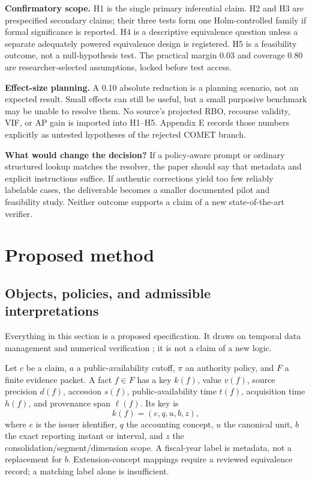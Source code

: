 \documentclass[11pt,a4paper]{article}
\newcommand{\pbreak}{\clearpage}
\newcommand{\lead}[1]{\textbf{\color{navy}#1}}
\newcommand{\status}[1]{\textsf{\color{teal}#1}}
\begin{document}
\lead{Confirmatory scope.} H1 is the single primary inferential claim. H2 and H3 are prespecified secondary claims; their three tests form one Holm-controlled family if formal significance is reported. H4 is a descriptive equivalence question unless a separate adequately powered equivalence design is registered. H5 is a feasibility outcome, not a null-hypothesis test. The practical margin 0.03 and coverage 0.80 are researcher-selected assumptions, locked before test access.

\lead{Effect-size planning.} A 0.10 absolute reduction is a planning scenario, not an expected result. Small effects can still be useful, but a small purposive benchmark may be unable to resolve them. No source's projected RBO, recourse validity, VIF, or AP gain is imported into H1--H5. Appendix E records those numbers explicitly as untested hypotheses of the rejected COMET branch.

\lead{What would change the decision?} If a policy-aware prompt or ordinary structured lookup matches the resolver, the paper should say that metadata and explicit instructions suffice. If authentic corrections yield too few reliably labelable cases, the deliverable becomes a smaller documented pilot and feasibility study. Neither outcome supports a claim of a new state-of-the-art verifier.

\pbreak
\section{Proposed method}
\subsection{Objects, policies, and admissible interpretations}
Everything in this section is a \status{proposed specification}. It draws on temporal data management and numerical verification \cite{jensen,verifin}; it is not a claim of a new logic.

Let $c$ be a claim, $a$ a public-availability cutoff, $\pi$ an authority policy, and $F$ a finite evidence packet. A fact $f\in F$ has a key $k(f)$, value $v(f)$, source precision $d(f)$, accession $s(f)$, public-availability time $t(f)$, acquisition time $h(f)$, and provenance span $\ell(f)$. Its key is
\[
k(f)=(e,q,u,b,z),
\]
where $e$ is the issuer identifier, $q$ the accounting concept, $u$ the canonical unit, $b$ the exact reporting instant or interval, and $z$ the consolidation/segment/dimension scope. A fiscal-year label is metadata, not a replacement for $b$. Extension-concept mappings require a reviewed equivalence record; a matching label alone is insufficient.
\end{document}
